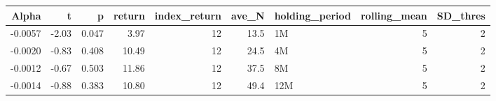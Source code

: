\begin{table}[ht]
\centering
\begin{tabular}{rrrrrrlrr}
  \hline
Alpha & t & p & return & index\_return & ave\_N & holding\_period & rolling\_mean & SD\_thres \\ 
  \hline
-0.0057 & -2.03 & 0.047 & 3.97 & 12 & 13.5 & 1M &  5 &  2 \\ 
  -0.0020 & -0.83 & 0.408 & 10.49 & 12 & 24.5 & 4M &  5 &  2 \\ 
  -0.0012 & -0.67 & 0.503 & 11.86 & 12 & 37.5 & 8M &  5 &  2 \\ 
  -0.0014 & -0.88 & 0.383 & 10.80 & 12 & 49.4 & 12M &  5 &  2 \\ 
   \hline
\end{tabular}
\end{table}

